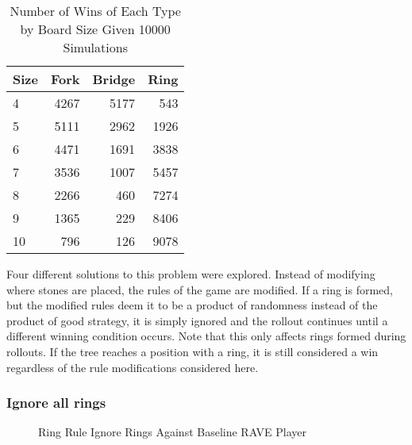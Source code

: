 \begin{table}
	\centering
	\begin{tabular}{l|rrr}
		Size & Fork & Bridge & Ring \\ \hline
		   4 & 4267 &   5177 &  543 \\
		   5 & 5111 &   2962 & 1926 \\
		   6 & 4471 &   1691 & 3838 \\
		   7 & 3536 &   1007 & 5457 \\
		   8 & 2266 &    460 & 7274 \\
		   9 & 1365 &    229 & 8406 \\
		   10 & 796 &    126 & 9078 \\
	\end{tabular}
	\caption{Number of Wins of Each Type by Board Size Given 10000 Simulations}
	\label{tab:wintypes}
\end{table}

Four different solutions to this problem were explored. Instead of modifying where stones are placed, the rules of the game are modified. If a ring is formed, but the modified rules deem it to be a product of randomness instead of the product of good strategy, it is simply ignored and the rollout continues until a different winning condition occurs. Note that this only affects rings formed during rollouts. If the tree reaches a position with a ring, it is still considered a win regardless of the rule modifications considered here.

\subsubsection{Ignore all rings}

\begin{figure}
	\centering
{}
	\caption{Ring Rule Ignore Rings Against Baseline RAVE Player}
	\label{fig:ringignore}
\end{figure}

